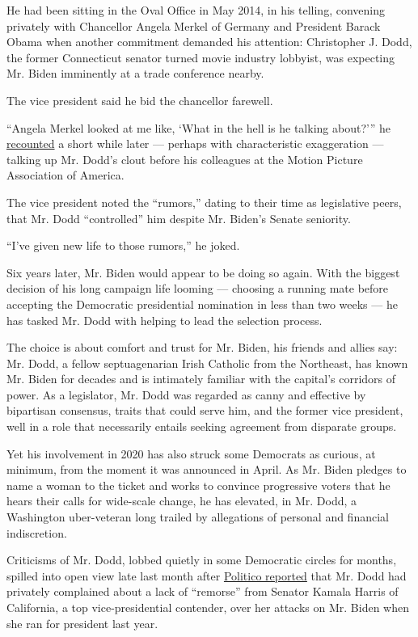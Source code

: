 He had been sitting in the Oval Office in May 2014, in his telling,
convening privately with Chancellor Angela Merkel of Germany and
President Barack Obama when another commitment demanded his attention:
Christopher J. Dodd, the former Connecticut senator turned movie
industry lobbyist, was expecting Mr. Biden imminently at a trade
conference nearby.

The vice president said he bid the chancellor farewell.

``Angela Merkel looked at me like, `What in the hell is he talking
about?''' he
\href{https://www.c-span.org/video/?319155-1/vice-president-biden-addresses-mpaa}{recounted}
a short while later --- perhaps with characteristic exaggeration ---
talking up Mr. Dodd's clout before his colleagues at the Motion Picture
Association of America.

The vice president noted the ``rumors,'' dating to their time as
legislative peers, that Mr. Dodd ``controlled'' him despite Mr. Biden's
Senate seniority.

``I've given new life to those rumors,'' he joked.

Six years later, Mr. Biden would appear to be doing so again. With the
biggest decision of his long campaign life looming --- choosing a
running mate before accepting the Democratic presidential nomination in
less than two weeks --- he has tasked Mr. Dodd with helping to lead the
selection process.

The choice is about comfort and trust for Mr. Biden, his friends and
allies say: Mr. Dodd, a fellow septuagenarian Irish Catholic from the
Northeast, has known Mr. Biden for decades and is intimately familiar
with the capital's corridors of power. As a legislator, Mr. Dodd was
regarded as canny and effective by bipartisan consensus, traits that
could serve him, and the former vice president, well in a role that
necessarily entails seeking agreement from disparate groups.

Yet his involvement in 2020 has also struck some Democrats as curious,
at minimum, from the moment it was announced in April. As Mr. Biden
pledges to name a woman to the ticket and works to convince progressive
voters that he hears their calls for wide-scale change, he has elevated,
in Mr. Dodd, a Washington uber-veteran long trailed by allegations of
personal and financial indiscretion.

Criticisms of Mr. Dodd, lobbed quietly in some Democratic circles for
months, spilled into open view late last month after
\href{https://www.politico.com/news/2020/07/27/kamala-harris-biden-vp-381829}{Politico
reported} that Mr. Dodd had privately complained about a lack of
``remorse'' from Senator Kamala Harris of California, a top
vice-presidential contender, over her attacks on Mr. Biden when she ran
for president last year.

